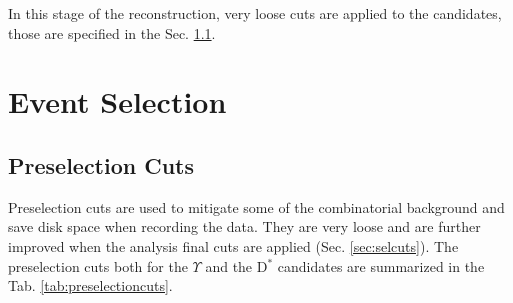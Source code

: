 In this stage of the reconstruction, very loose cuts are applied to the candidates, those are specified in the Sec. \ref{subsec:preselcuts}.

\section{Event Selection}\label{sec:evtsel}

\subsection{Preselection Cuts} \label{subsec:preselcuts}

Preselection cuts are used to mitigate some of the combinatorial background and save disk space when recording the data. They are very loose and are further improved when the analysis final cuts are applied (Sec. \ref{sec:selcuts}). The preselection cuts both for the $\Upsilon$ and the D$^*$ candidates are summarized in the Tab. \ref{tab:preselectioncuts}.

